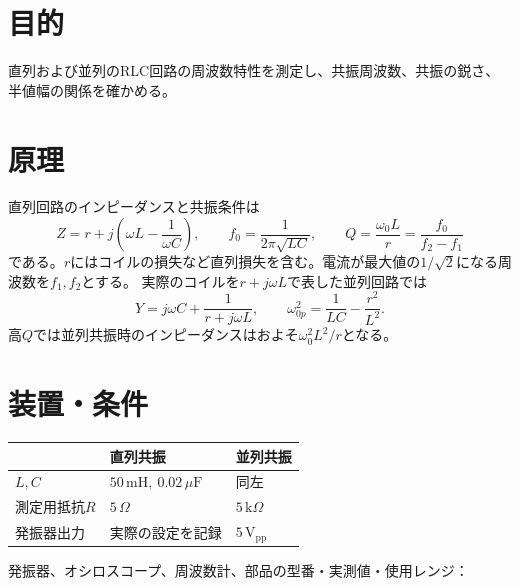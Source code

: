 \documentclass[lualatex,a4paper,10pt]{jlreq}
\begin{document}
\reporttitle
{}

\section{目的}\label{sec:auto1}
直列および並列のRLC回路の周波数特性を測定し、共振周波数、共振の鋭さ、半値幅の関係を確かめる。
\section{原理}\label{sec:auto2}
直列回路のインピーダンスと共振条件は
\[
 Z=r+j\left(\omega L-\frac1{\omega C}\right),\qquad
 f_0=\frac1{2\pi\sqrt{LC}},\qquad Q=\frac{\omega_0L}{r}
      =\frac{f_0}{f_2-f_1}
\]
である。$r$にはコイルの損失など直列損失を含む。電流が最大値の$1/\sqrt2$になる周波数を$f_1,f_2$とする。
実際のコイルを$r+j\omega L$で表した並列回路では
\[
 Y=j\omega C+\frac1{r+j\omega L},\qquad
 \omega_{0p}^2=\frac1{LC}-\frac{r^2}{L^2}.
\]
高$Q$では並列共振時のインピーダンスはおよそ$\omega_0^2L^2/r$となる。
\section{装置・条件}\label{sec:auto3}
\par\noindent\begin{tabularx}{\linewidth}{lYY}
\toprule & 直列共振 & 並列共振\\\midrule
$L,C$ & $50\,\mathrm{mH},\ 0.02\,\mu\mathrm{F}$ & 同左\\
測定用抵抗$R$ & $5\,\Omega$ & $5\,\mathrm{k}\Omega$\\
発振器出力 & 実際の設定を記録 & $5\,\mathrm{V_{pp}}$\\
\bottomrule
\end{tabularx}
発振器、オシロスコープ、周波数計、部品の型番・実測値・使用レンジ：
\writing{14mm}
\clearpage
\end{document}
